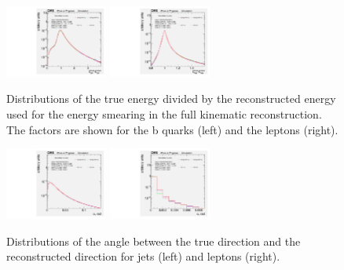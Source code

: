 \begin{figure}[!htb]
    \begin{center}
        \includegraphics[width=0.30\textwidth]{fig_fullRun2UL/SmearingPlots/ULcomp_KinReco_fE_jet_step7.pdf}
        \includegraphics[width=0.30\textwidth]{fig_fullRun2UL/SmearingPlots/ULcomp_KinReco_fE_lep_step7.pdf}
        \caption{\small Distributions of the true energy divided by the reconstructed energy used for the energy smearing in the \ttbar full kinematic reconstruction. 
        The factors are shown for the b quarks (left) and the leptons (right).}
    \label{fig:energyFactor}
    \end{center}
\end{figure}

\begin{figure}[!htb]
    \begin{center}
        \includegraphics[width=0.30\textwidth]{fig_fullRun2UL/SmearingPlots/ULcomp_KinReco_d_angle_jet_step7.pdf}
        \includegraphics[width=0.30\textwidth]{fig_fullRun2UL/SmearingPlots/ULcomp_KinReco_d_angle_lep_step7.pdf}
        \caption{\small Distributions of the angle between the true direction and the reconstructed direction for jets (left) and leptons (right).}
       \label{fig:angleFactor}
    \end{center}
\end{figure}

